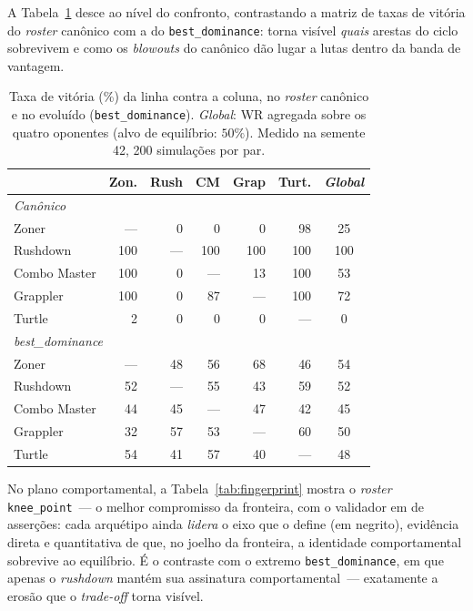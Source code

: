 \documentclass[12pt]{article}
\begin{document}
A Tabela~\ref{tab:matchups} desce ao nível do confronto, contrastando a matriz de
taxas de vitória do \emph{roster} canônico com a do \texttt{best\_dominance}: torna
visível \emph{quais} arestas do ciclo sobrevivem e como os \emph{blowouts} do
canônico dão lugar a lutas dentro da banda de vantagem.

\begin{table}[ht]
\centering
\caption{Taxa de vitória (\%) da linha contra a coluna, no \emph{roster} canônico e
no evoluído (\texttt{best\_dominance}). \emph{Global}: WR agregada sobre os quatro
oponentes (alvo de equilíbrio: $50\%$). Medido na semente 42, 200 simulações por par.}
\label{tab:matchups}
\footnotesize
\begin{tabular}{lrrrrrc}
\toprule
 & Zon. & Rush & CM & Grap & Turt. & \emph{Global} \\
\midrule
\multicolumn{7}{l}{\textit{Canônico}}\\
Zoner        & ---  & 0    & 0    & 0    & 98   & 25  \\
Rushdown     & 100  & ---  & 100  & 100  & 100  & 100 \\
Combo Master & 100  & 0    & ---  & 13   & 100  & 53  \\
Grappler     & 100  & 0    & 87   & ---  & 100  & 72  \\
Turtle       & 2    & 0    & 0    & 0    & ---  & 0   \\
\midrule
\multicolumn{7}{l}{\textit{best\_dominance}}\\
Zoner        & ---  & 48   & 56   & 68   & 46   & 54  \\
Rushdown     & 52   & ---  & 55   & 43   & 59   & 52  \\
Combo Master & 44   & 45   & ---  & 47   & 42   & 45  \\
Grappler     & 32   & 57   & 53   & ---  & 60   & 50  \\
Turtle       & 54   & 41   & 57   & 40   & ---  & 48  \\
\bottomrule
\end{tabular}
\end{table}

No plano comportamental, a Tabela~\ref{tab:fingerprint} mostra o \emph{roster}
\texttt{knee\_point}~--- o melhor compromisso da fronteira, com o validador em \valKnee{}
de \valTotal{} asserções: cada arquétipo ainda \emph{lidera} o eixo que o define (em negrito),
evidência direta e quantitativa de que, no joelho da fronteira, a identidade
comportamental sobrevive ao equilíbrio. É o contraste com o extremo
\texttt{best\_dominance}, em que apenas o \emph{rushdown} mantém sua assinatura
comportamental~--- exatamente a erosão que o \emph{trade-off} torna visível.
\end{document}
